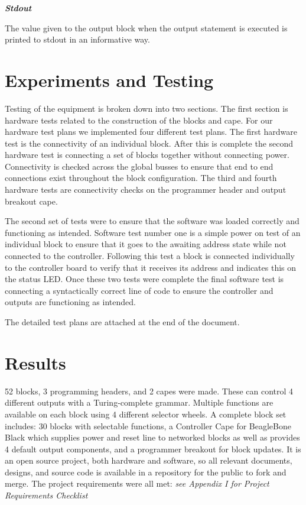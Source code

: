 \documentclass[12pt,a4paper]{article}
\begin{document}
      \textit{\textbf{ Stdout}}
      
      The value given to the output block when the output statement is executed is printed to stdout in an informative way. 
      
      \section{Experiments and Testing}
      Testing of the equipment is broken down into two sections. The first section is hardware tests related to the construction of the blocks and cape. For our hardware test plans we implemented four different test plans. The first hardware test is the connectivity of an individual block. After this is complete the second hardware test is connecting a set of blocks together without connecting power. Connectivity is checked across the global busses to ensure that end to end connections exist throughout the block configuration. The third and fourth hardware tests are connectivity checks on the programmer header and output breakout cape.
      
      The second set of tests were to ensure that the software was loaded correctly and functioning as intended. Software test number one is a simple power on test of an individual block to ensure that it goes to the awaiting address state while not connected to the controller. Following this test a block is connected individually to the controller board to verify that it receives its address and indicates this on the status LED. Once these two tests were complete the final software test is connecting a syntactically correct line of code to ensure the controller and outputs are functioning as intended. 
      
      The detailed test plans are attached at the end of the document. 
     
     \section{Results}
     52 blocks, 3 programming headers, and 2 capes were made. These can control 4 different outputs with a Turing-complete grammar. Multiple functions are available on each block using 4 different selector wheels. A complete block set includes: 30 blocks with selectable functions, a Controller Cape for BeagleBone Black which supplies power and reset line to networked blocks as well as provides 4 default output components, and a programmer breakout for block updates. It is an open source project, both hardware and software, so all relevant documents, designs, and source code is available in a repository for the public to fork and merge. 
     The project requirements were all met: \textit{see Appendix I for Project Requirements Checklist}
     
\end{document}
